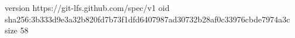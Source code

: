 version https://git-lfs.github.com/spec/v1
oid sha256:3b333d9e3a32b820fd7b73f1dfd6407987ad30732b28af0c33976cbde7974a3c
size 58

